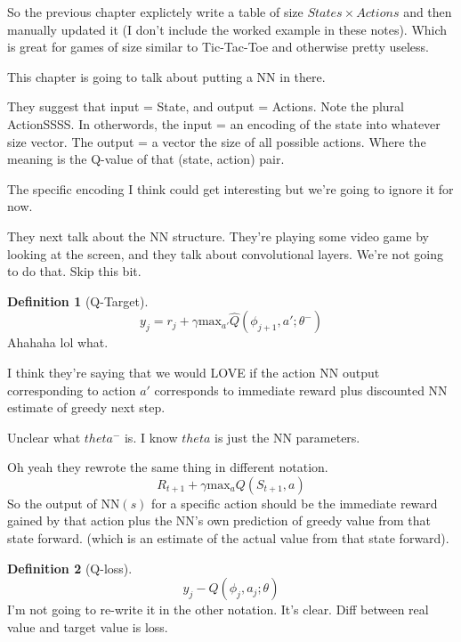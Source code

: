 \documentclass[11pt,notitlepage]{report}
\theoremstyle{definition}
\newtheorem{definition}{Definition}
\theoremstyle{plain}
\begin{document}
So the previous chapter explictely write a table of size $States \times Actions$
and then manually updated it (I don't include the worked example in these notes).
Which is great for games of size similar to Tic-Tac-Toe and otherwise pretty useless.

This chapter is going to talk about putting a NN in there.

They suggest that input = State, and output = Actions. Note the plural ActionSSSS.
In otherwords, the input = an encoding of the state into whatever size vector.
The output = a vector the size of all possible actions. Where the meaning is the Q-value
of that (state, action) pair.

The specific encoding I think could get interesting but we're going to ignore it for now.

They next talk about the NN structure. They're playing some video game by looking at the
screen, and they talk about convolutional layers. We're not going to do that. Skip this
bit.

\begin{definition}[Q-Target]\label{def:q-target}
    \[y_j = r_j + \gamma \text{max}_{a'}\hat{Q}\left(\phi_{j+1}, a'; \theta^-\right)\]
    Ahahaha lol what.

    I think they're saying that we would LOVE if the action NN output corresponding to
    action $a'$ corresponds to immediate reward plus discounted NN estimate of greedy
    next step.

    Unclear what $theta^-$ is. I know $theta$ is just the NN parameters.

    Oh yeah they rewrote the same thing in different notation.
    \[R_{t+1} + \gamma \text{max}_{a} Q\left(S_{t+1}, a\right)\]
    So the output of $\text{NN}(s)$ for a specific action should be the immediate
    reward gained by that action plus the NN's own prediction of greedy value from
    that state forward. (which is an estimate of the actual value from that state forward).
\end{definition}
\begin{definition}[Q-loss]\label{def:q-loss}
    \[y_j - Q\left(\phi_j, a_j; \theta\right)\]
    I'm not going to re-write it in the other notation. It's clear.
    Diff between real value and target value is loss.
\end{definition}
\end{document}
